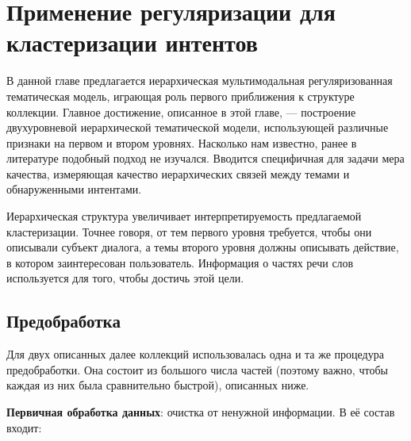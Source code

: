 \chapter{Применение регуляризации для кластеризации интентов}

В данной главе предлагается иерархическая мультимодальная регуляризованная тематическая модель, играющая роль первого приближения к структуре коллекции. Главное достижение, описанное в этой главе, --- построение двухуровневой иерархической тематической модели, использующей различные признаки на первом и втором уровнях. Насколько нам известно, ранее в литературе подобный подход не изучался.  Вводится специфичная для задачи мера качества, измеряющая качество иерархических связей между темами и обнаруженными интентами.

Иерархическая структура увеличивает интерпретируемость предлагаемой кластеризации. Точнее говоря, от тем первого уровня требуется, чтобы они описывали субъект диалога, а темы второго уровня должны описывать действие, в котором заинтересован пользователь. Информация о частях речи слов используется для того, чтобы достичь этой цели.

\section{Предобработка} \label{nlp_methods}

Для двух описанных далее коллекций использовалась одна и та же процедура предобработки. Она состоит из большого числа частей (поэтому важно, чтобы каждая из них была сравнительно быстрой), описанных ниже.

\textbf{Первичная обработка данных}: очистка от ненужной информации. В её состав входит:

